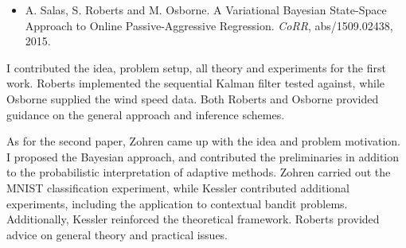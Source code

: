 \begin{itemize}[label={}]
	\item A. Salas, S. Roberts and M. Osborne. A Variational Bayesian State-Space Approach to Online Passive-Aggressive Regression. \emph{CoRR}, abs/1509.02438, 2015.

\end{itemize}

I contributed the idea, problem setup, all theory and experiments for the first work. Roberts implemented the sequential Kalman filter tested against, while Osborne supplied the wind speed data. Both Roberts and Osborne provided guidance on the general approach and inference schemes. 

As for the second paper, Zohren came up with the idea and problem motivation. I proposed the Bayesian approach, and contributed the preliminaries in addition to the probabilistic interpretation of adaptive methods. Zohren carried out the MNIST classification experiment, while Kessler contributed additional experiments, including the application to contextual bandit problems. Additionally, Kessler reinforced the theoretical framework. Roberts provided advice on general theory and practical issues.